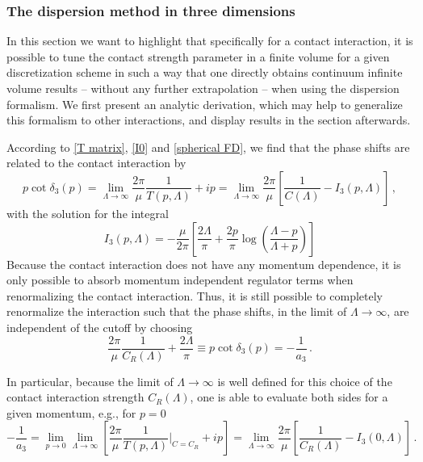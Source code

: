 \subsubsection{The dispersion method in three dimensions}\label{sec:3D dispersion}
In this section we want to highlight that specifically for a contact interaction, it is possible to tune the contact strength parameter in a finite volume for a given discretization scheme in such a way that one directly obtains continuum infinite volume results -- without any further extrapolation -- when using the dispersion formalism.
We first present an analytic derivation, which may help to generalize this formalism to other interactions, and display results in the section afterwards.

According to \eqref{T matrix}, \eqref{I0} and \eqref{spherical FD}, we find that the phase shifts are related to the contact interaction by
\begin{equation}
	p \cot \delta_3(p)
	= \lim\limits_{\Lambda \to \infty}\frac{2 \pi}{\mu}\frac{1}{T(p, \Lambda)} + i p
	= \lim\limits_{\Lambda \to \infty}
		\frac{2 \pi}{\mu} \left[
			\frac{1}{C(\Lambda)} - I_3(p, \Lambda)
		\right]
	\, ,
\end{equation}
with the solution for the integral
\begin{equation}
	I_3(p, \Lambda)
	=
	-\frac{\mu}{2 \pi}
	\left[
	\frac{2 \Lambda}{\pi} + \frac{2  p}{\pi} \log \left( \frac{\Lambda - p}{\Lambda + p}\right)
	\right]
\end{equation}
Because the contact interaction does not have any momentum dependence, it is only possible to absorb momentum independent regulator terms when renormalizing the contact interaction.
Thus, it is still possible to completely renormalize the interaction such that the phase shifts, in the limit of $\Lambda \to \infty$, are independent of the cutoff by choosing
\begin{equation}
	\frac{2 \pi}{\mu} \frac{1}{C_R(\Lambda)} + \frac{2 \Lambda}{\pi} \equiv p \cot \delta_3(p) = - \frac{1}{a_3} \, .
\end{equation}


In particular, because the limit of $\Lambda \to \infty$ is well defined for this choice of the contact interaction strength $C_R(\Lambda)$, one is able to evaluate both sides for a given momentum, e.g., for $p=0$
\begin{equation}
	- \frac{1}{a_3}
	=
	\lim\limits_{p \to 0}\lim\limits_{\Lambda \to \infty}
		\left[
			\frac{2 \pi}{\mu}\frac{1}{T(p, \Lambda)} \bigg|_{C=C_R} + i p
	\right]
	=
	\lim\limits_{\Lambda \to \infty}
	\frac{2 \pi}{\mu}
		\left[
		\frac{1}{C_R(\Lambda)} - I_3(0, \Lambda)
		\right]
	\, .
\end{equation}

